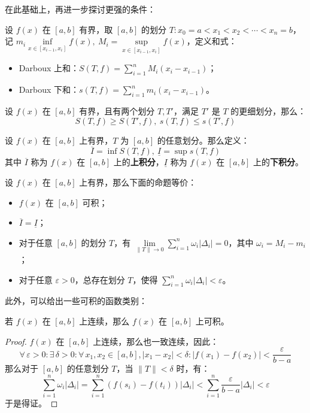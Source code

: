 在此基础上，再进一步探讨更强的条件：

\begin{definition}
	设 $f(x)$ 在 $[a, b]$ 有界，取 $[a, b]$ 的划分 $T: x_0 = a < x_1 < x_2 < \cdots < x_n = b$，记 $m_i \inf\limits_{x \in [x_{i-1}, x_i]} f(x),\ M_i = \sup\limits_{x \in [x_{i-1}, x_i]} f(x)$，定义和式：

	\begin{itemize}
		\item Darboux 上和：$\displaystyle S(T, f) = \sum_{i=1}^n M_i (x_i - x_{i-1})$；
		\item Darboux 下和：$\displaystyle s(T, f) = \sum_{i=1}^n m_i (x_i - x_{i-1})$。
	\end{itemize}
\end{definition}

\begin{theorem}
	设 $f(x)$ 在 $[a, b]$ 有界，且有两个划分 $T, T'$，满足 $T'$ 是 $T$ 的更细划分，那么：
	$$
	S(T, f) \ge S(T', f),\ s(T, f) \le s(T', f)
	$$
\end{theorem}

\begin{definition}
	设 $f(x)$ 在 $[a, b]$ 上有界，$T$ 为 $[a, b]$ 的任意划分。那么定义：
	$$
	\overline{I} = \inf S(T, f),\ \underline{I} = \sup s(T, f)
	$$
	其中 $\overline{I}$ 称为 $f(x)$ 在 $[a, b]$ 上的\textbf{上积分}，$\underline{I}$ 称为 $f(x)$ 在 $[a, b]$ 上的\textbf{下积分}。
\end{definition}

\begin{theorem}
	设 $f(x)$ 在 $[a, b]$ 上有界，那么下面的命题等价：

	\begin{itemize}
		\item $f(x)$ 在 $[a, b]$ 可积；
		\item $\overline{I} = \underline{I}$；
		\item 对于任意 $[a, b]$ 的划分 $T$，有 $\displaystyle \lim\limits_{\lVert T \rVert \to 0} \sum_{i=1}^n \omega_i |\Delta_i| = 0$，其中 $\omega_i = M_i - m_i$；
		\item 对于任意 $\varepsilon > 0$，总存在划分 $T$，使得 $\displaystyle \sum_{i=1}^n \omega_i |\Delta_i| < \varepsilon$。
	\end{itemize}
\end{theorem}

此外，可以给出一些可积的函数类别：

\begin{theorem}
	若 $f(x)$ 在 $[a, b]$ 上连续，那么 $f(x)$ 在 $[a, b]$ 上可积。

	\begin{proof}
		$f(x)$ 在 $[a, b]$ 上连续，那么也一致连续，因此：
		$$
		\forall\,\varepsilon > 0: \exists\,\delta > 0: \forall\,x_1, x_2 \in [a, b], |x_1 - x_2| < \delta: |f(x_1) - f(x_2)| < \frac{\varepsilon}{b - a}
		$$
		那么对于 $[a, b]$ 的任意划分 $T$，当 $\lVert T \rVert < \delta$ 时，有：
		$$
		\sum_{i=1}^n \omega_i |\Delta_i| = \sum_{i=1}^n (f(s_i) - f(t_i)) |\Delta_i| < \sum_{i=1}^n \frac{\varepsilon}{b - a} |\Delta_i| < \varepsilon
		$$
		于是得证。
	\end{proof}
\end{theorem}

